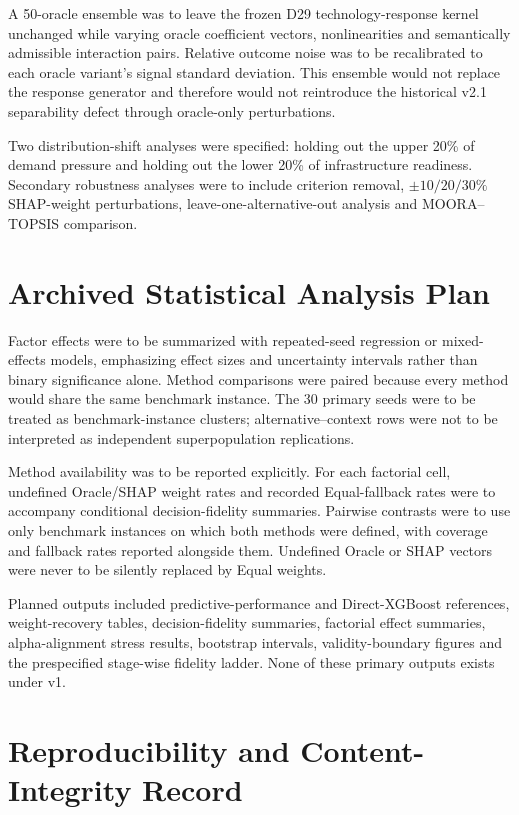 \documentclass[runningheads]{llncs}
\begin{document}
A 50-oracle ensemble was to leave the frozen D29 technology-response kernel unchanged while
varying oracle coefficient vectors, nonlinearities and semantically admissible interaction
pairs. Relative outcome noise was to be recalibrated to each oracle variant's signal standard
deviation. This ensemble would not replace the response generator and therefore would not
reintroduce the historical v2.1 separability defect through oracle-only perturbations.

Two distribution-shift analyses were specified: holding out the upper 20\% of demand pressure
and holding out the lower 20\% of infrastructure readiness. Secondary robustness analyses were
to include criterion removal, $\pm10/20/30\%$ SHAP-weight perturbations,
leave-one-alternative-out analysis and MOORA--TOPSIS comparison.

\section{Archived Statistical Analysis Plan}

Factor effects were to be summarized with repeated-seed regression or mixed-effects models,
emphasizing effect sizes and uncertainty intervals rather than binary significance alone.
Method comparisons were paired because every method would share the same benchmark instance.
The 30 primary seeds were to be treated as benchmark-instance clusters; alternative--context
rows were not to be interpreted as independent superpopulation replications.

Method availability was to be reported explicitly. For each factorial cell, undefined
Oracle/SHAP weight rates and recorded Equal-fallback rates were to accompany conditional
decision-fidelity summaries. Pairwise contrasts were to use only benchmark instances on which
both methods were defined, with coverage and fallback rates reported alongside them. Undefined
Oracle or SHAP vectors were never to be silently replaced by Equal weights.

Planned outputs included predictive-performance and Direct-XGBoost references, weight-recovery
tables, decision-fidelity summaries, factorial effect summaries, alpha-alignment stress results,
bootstrap intervals, validity-boundary figures and the prespecified stage-wise fidelity ladder.
None of these primary outputs exists under v1.

\section{Reproducibility and Content-Integrity Record}
\label{supp:sec:integrity}
\end{document}
